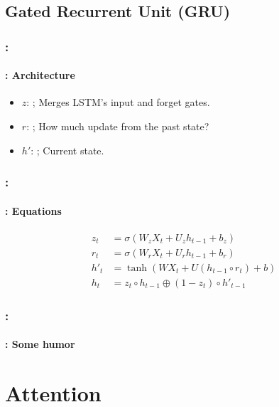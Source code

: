 \documentclass[xcolor=table]{beamer}
\begin{document}
\subsection{Gated Recurrent Unit (GRU)}

\begin{frame}
	\frametitle{\insertshortsubtitle: \insertsection}
	\framesubtitle{\insertsubsection: Architecture}
	
	\begin{minipage}{0.50\textwidth} 
		\begin{itemize}
			\item $z$: ;
			Merges LSTM's input and forget gates. 
			\item $r$: ; 
			How much update from the past state?
			\item $h'$: ;
			Current state.	
		\end{itemize}
	\end{minipage}
	\begin{minipage}{0.49\textwidth}
	\end{minipage}

\end{frame}

\begin{frame}
	\frametitle{\insertshortsubtitle: \insertsection}
	\framesubtitle{\insertsubsection: Equations}
	
	{\huge\vskip-24pt
	\begin{align*}
	z_t &= \sigma(W_z X_t + U_z h_{t-1} + b_z) \\
	r_t &= \sigma(W_r X_t + U_r h_{t-1} + b_r) \\
	h'_t &= \tanh(W X_t + U (h_{t-1} \circ r_t) + b) \\
	h_t &= z_t \circ h_{t-1} \oplus (1-z_t) \circ h'_{t-1}
	\end{align*}
	}
	
\end{frame}

\begin{frame}
	\frametitle{\insertshortsubtitle: \insertsection}
	\framesubtitle{\insertsubsection: Some humor}
	
	\begin{center}
	\end{center}
	
\end{frame}


\section{Attention}
\end{document}
